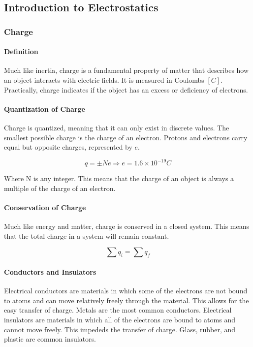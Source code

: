 \subsection{Introduction to Electrostatics}

\hrulefill

\subsubsection*{Charge}

\paragraph*{Definition}
Much like inertia, charge is a fundamental property of matter that describes how an object interacts with 
electric fields. It is measured in Coulombs $[C]$. Practically, charge indicates if the object has an excess 
or deficiency of electrons.

\paragraph*{Quantization of Charge}
Charge is quantized, meaning that it can only exist in discrete values. 
The smallest possible charge is the charge of an electron. Protons and electrons carry equal but opposite charges, 
represented by $e$.

\begin{equation*}
    q = \pm Ne \Longrightarrow e = 1.6 \times 10^{-19}C
\end{equation*}

Where N is any integer. This means that the charge of an object is always a multiple of the charge of an electron.

\paragraph*{Conservation of Charge}
Much like energy and matter, charge is conserved in a closed system. This means that the total charge in a system
will remain constant. 

\begin{equation*}
    \sum q_i = \sum q_f
\end{equation*}


\paragraph*{Conductors and Insulators}
Electrical conductors are materials in which some of the electrons are not bound to atoms and can move relatively freely
through the material. This allows for the easy transfer of charge. Metals are the most common conductors. 
Electrical insulators are materials in which all of the electrons are bound to atoms and cannot move freely. This impededs
the transfer of charge. Glass, rubber, and plastic are common insulators.\\



